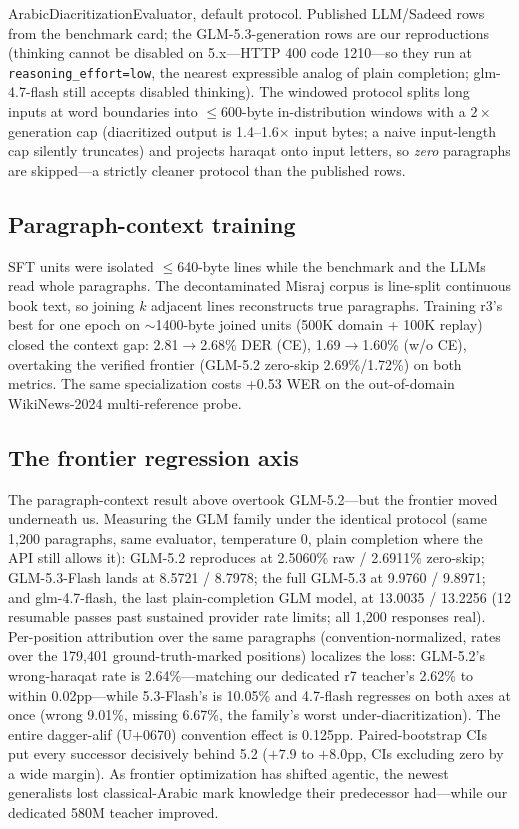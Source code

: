 \documentclass[11pt]{article}
\begin{document}
\begin{table}[h]
{ArabicDiacritizationEvaluator, default protocol. Published
LLM/Sadeed rows from the benchmark card; the GLM-5.3-generation rows
are our reproductions (thinking cannot be disabled on 5.x---HTTP 400
code 1210---so they run at \texttt{reasoning\_effort=low}, the nearest
expressible analog of plain completion; glm-4.7-flash still accepts
disabled thinking). The windowed protocol
splits long inputs at word boundaries into $\leq$600-byte
in-distribution windows with a $2\times$ generation cap (diacritized
output is 1.4--1.6$\times$ input bytes; a naive input-length cap
silently truncates) and projects haraqat onto input letters, so
\emph{zero} paragraphs are skipped---a strictly cleaner protocol than
the published rows.}
\end{table}

\subsection{Paragraph-context training}
SFT units were isolated $\leq$640-byte lines while the benchmark and
the LLMs read whole paragraphs. The decontaminated Misraj corpus is
line-split continuous book text, so joining $k$ adjacent lines
reconstructs true paragraphs. Training r3's best for one epoch on
${\sim}$1400-byte joined units (500K domain + 100K replay) closed the
context gap: 2.81$\to$2.68\% DER (CE), 1.69$\to$1.60\% (w/o CE),
overtaking the verified frontier (GLM-5.2 zero-skip 2.69\%/1.72\%)
on both metrics. The same specialization costs +0.53 WER on the
out-of-domain WikiNews-2024 multi-reference probe.

\subsection{The frontier regression axis}
The paragraph-context result above overtook GLM-5.2---but the frontier
moved underneath us. Measuring the GLM family under the identical
protocol (same 1,200 paragraphs, same evaluator, temperature 0, plain
completion where the API still allows it):
GLM-5.2 reproduces at 2.5060\% raw / 2.6911\% zero-skip;
GLM-5.3-Flash lands at 8.5721 / 8.7978; the full GLM-5.3 at
9.9760 / 9.8971; and glm-4.7-flash, the last plain-completion GLM
model, at 13.0035 / 13.2256 (12 resumable passes past sustained
provider rate limits; all 1,200 responses real). Per-position
attribution over the same paragraphs (convention-normalized, rates
over the 179{,}401 ground-truth-marked positions) localizes the loss:
GLM-5.2's wrong-haraqat rate is 2.64\%---matching our dedicated r7
teacher's 2.62\% to within 0.02pp---while 5.3-Flash's is 10.05\% and
4.7-flash regresses on both axes at once (wrong 9.01\%, missing
6.67\%, the family's worst under-diacritization). The entire
dagger-alif (U+0670) convention effect is 0.125pp. Paired-bootstrap
CIs put every successor decisively behind 5.2 ($+7.9$ to $+8.0$pp,
CIs excluding zero by a wide margin). As frontier optimization has
shifted agentic, the newest generalists lost classical-Arabic mark
knowledge their predecessor had---while our dedicated 580M teacher
improved.
\end{document}
